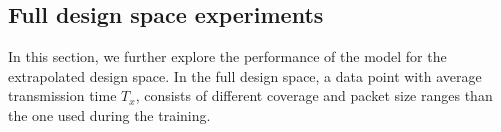 





\subsection{Full design space experiments}


 
 In this section, we further explore the performance of the model for the extrapolated design space. In the full design space, a data point with average transmission time $T_x$, consists of different coverage and packet size ranges than the one used during the training.
 
